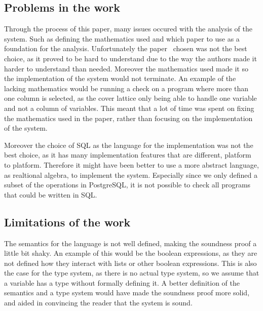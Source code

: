 \subsection{Problems in the work}
Through the process of this paper, many issues occured with the analysis of the system. Such as defining the mathematics used and which paper to use as a foundation for the analysis. Unfortunately the paper~\cite{halder_abstract_2012} chosen was not the best choice, as it proved to be hard to understand due to the way the authors made it harder to understand than needed. Moreover the mathematics used made it so the implementation of the system would not terminate. 
An example of the lacking mathematics would be running a check on a program where more than one column is selected, as the cover lattice only being able to handle one variable and not a column of variables.
This meant that a lot of time was spent on fixing the mathematics used in the paper, rather than focusing on the implementation of the system.

Moreover the choice of SQL as the language for the implementation was not the best choice, as it has many implementation features that are different, platform to platform. Therefore it might have been better to use a more abstract language, as realtional algebra, to implement the system.
Especially since we only defined a subset of the operations in PostgreSQL, it is not possible to check all programs that could be written in SQL.

\subsection{Limitations of the work}
The semantics for the language is not well defined, making the soundness proof a little bit shaky. An example of this would be the boolean expressions, as they are not defined how they interact with lists or other boolean expressions. This is also the case for the type system, as there is no actual type system, so we assume that a variable has a type without formally defining it.
A better definition of the semantics and a type system would have made the soundness proof more solid, and aided in convincing the reader that the system is sound.
